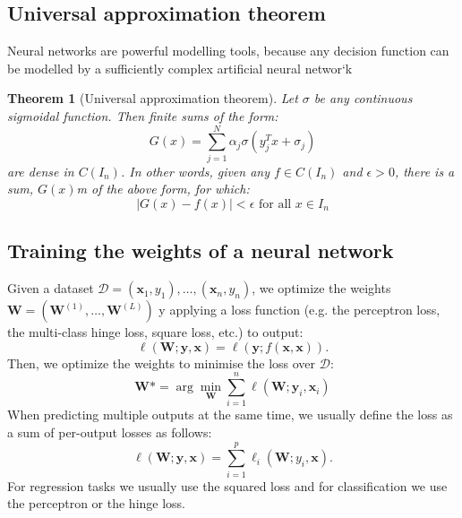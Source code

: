 \documentclass[a4paper,10pt,twoside]{article}
\newtheorem{theorem}{Theorem}
\begin{document}
\subsection{Universal approximation theorem}

Neural networks are powerful modelling tools, because any decision function can be modelled by a sufficiently complex artificial neural networ`k

\begin{theorem}[Universal approximation theorem]
    Let $\sigma$ be any continuous sigmoidal function. Then finite sums of the form:
    \begin{equation*}
        G(x)=\sum_{j=1}^{N}\alpha_j\sigma(y_j^Tx+\sigma_j)
    \end{equation*}
    are dense in $C(I_n)$. In other words, given any $f\in C(I_n)$ and $\epsilon>0$, there is a sum, $G(x)$m of the above form, for which:
    \begin{equation*}
        |G(x)-f(x)|<\epsilon\text{ for all }x\in I_n
    \end{equation*}
\end{theorem}

\subsection{Training the weights of a neural network}

Given a dataset $\mathcal{D} = {(\mathbf{x}_1,y_1),\ldots,(\mathbf{x}_n,y_n)}$, we optimize the weights $\mathbf{W}=(\mathbf{W}^{(1)}, \ldots, \mathbf{W}^{(L)})$ y applying a loss function (e.g. the perceptron loss, the multi-class hinge loss, square loss, etc.) to output:
\begin{equation*}\label{empiricalriskminimisation}
    \ell(\mathbf{W};\mathbf{y}, \mathbf{x})=\ell(\mathbf{y};f(\mathbf{x},\mathbf{x})).
\end{equation*}
Then, we optimize the weights to minimise the loss over $\mathcal{D}$:
\begin{equation*}
    \mathbf{W}*=\arg\min_{\mathbf{W}}\sum_{i=1}^{n}\ell(\mathbf{W};\mathbf{y}_i,\mathbf{x}_i)
\end{equation*}
When predicting multiple outputs at the same time, we usually define the loss as a sum of per-output losses as follows:
\begin{equation*}
    \ell(\mathbf{W};\mathbf{y},\mathbf{x})=\sum_{i=1}^{p}\ell_i(\mathbf{W};y_i,\mathbf{x}).
\end{equation*}
For regression tasks we usually use the squared loss and for classification we use the perceptron or the hinge loss.
\end{document}
